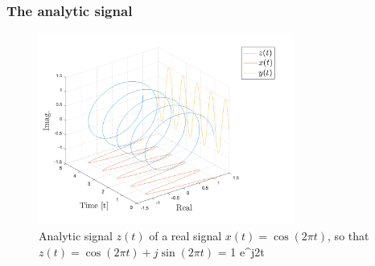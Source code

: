 \begin{frame}
    \frametitle{The analytic signal}
    \small
    
    \begin{figure}
        \centering
        \includegraphics[width=0.75\textwidth]{images/analytic-signal.png}
        \caption{Analytic signal $z(t)$ of a real signal $x(t)=\cos(2\pi t)$, so that $z(t)=\cos(2\pi t) + j\sin(2\pi t)$ = 1 e^{j2\pi t}}
        \label{fig:spectrum}
    \end{figure}
   
\end{frame}